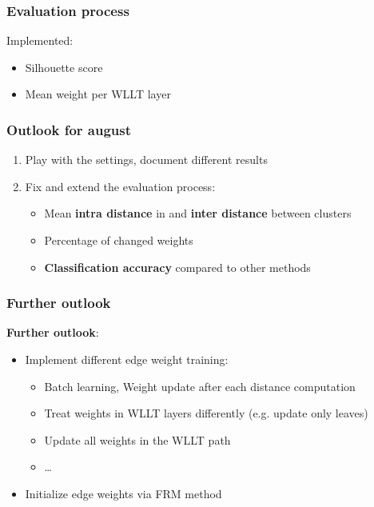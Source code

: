 \begin{frame}
\frametitle{Evaluation process}
	Implemented:
	\begin{itemize}
		\item Silhouette score \newline
		\item Mean weight per WLLT layer
	\end{itemize}
\end{frame}



\begin{frame}
\frametitle{Outlook for august} \vspace{-1cm}
	\begin{enumerate}
		\item Play with the settings, document different results \newline	
		\item Fix and extend the evaluation process:
		\begin{itemize}
			\item Mean \textbf{intra distance} in and \textbf{inter distance} between clusters
			\item Percentage of changed weights
			\item \textbf{Classification accuracy} compared to other methods
		\end{itemize}
	\end{enumerate}
\end{frame}


\begin{frame}
	\frametitle{Further outlook} \vspace{-1cm}
	\textbf{Further outlook}:
	\begin{itemize}
		\item Implement different edge weight training:
		\begin{itemize}
			\item Batch learning, Weight update after each distance computation
			\item Treat weights in WLLT layers differently (e.g. update only leaves)
			\item Update all weights in the WLLT path
			\item \dots \newline
		\end{itemize}
		\item Initialize edge weights via FRM method
	\end{itemize}
\end{frame}

